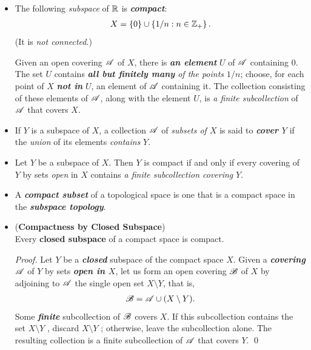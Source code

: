 \documentclass[11pt]{article}
\begin{document}
\begin{itemize}
\item \begin{example}
The following \emph{subspace} of ${\mathbb R}$ is \emph{\textbf{compact}}:
\begin{align*}
X = \left\{0\right\} \cup \left\{1/n: n\in {\mathbb Z}_{+}\right\}.
\end{align*} (It is \emph{not connected}.)

Given an open covering ${\mathscr A}$ of $X$, there is \emph{\textbf{an element}} $U$ of ${\mathscr A}$ containing $0$. The set $U$ contains \emph{\textbf{all but finitely many} of the points $1/n$}; choose, for each point of $X$ \emph{\textbf{not in}} $U$, an element of ${\mathscr A}$ containing it. The collection consisting of these elements of ${\mathscr A}$, along with the element $U$, is \emph{a finite subcollection} of ${\mathscr A}$ that covers $X$.
\end{example}

\item \begin{definition}
If $Y$ is a subspace of $X$, a collection ${\mathscr A}$ of \emph{subsets of $X$} is said to \emph{\textbf{cover $Y$}} if the \emph{union} of its elements \emph{contains} $Y$.
\end{definition}


\item \begin{lemma}
Let $Y$ be a subspace of $X$. Then $Y$ is compact if and only if every covering of $Y$ by sets \emph{open} in $X$ contains \emph{a finite subcollection covering} $Y$.
\end{lemma}

\item \begin{remark}
A \emph{\textbf{compact subset}} of a topological space is one that is a compact space in the \emph{\textbf{subspace topology}}. 
\end{remark}

\item \begin{proposition} (\textbf{Compactness by Closed Subspace}) \citep{munkres2000topology}\\
Every \textbf{closed subspace} of a compact space is compact.
\end{proposition}
\begin{proof}
Let $Y$ be a \emph{\textbf{closed}} subspace of the compact space $X$. Given a \emph{\textbf{covering}} ${\mathscr A}$ of $Y$ by sets \emph{\textbf{open in $X$}}, let us form an open covering ${\mathscr B}$ of $X$ by adjoining to ${\mathscr A}$ the single open set $X \setminus Y$, that is,
\begin{align*}
{\mathscr B} = {\mathscr A} \cup (X \setminus Y).
\end{align*}
Some \emph{\textbf{finite}} subcollection of ${\mathscr B}$ covers $X$. If this subcollection contains the set $X \setminus Y$ ,
discard $X \setminus Y$ ; otherwise, leave the subcollection alone. The resulting collection is a finite subcollection of ${\mathscr A}$ that covers $Y$. \qed
\end{proof}


\end{itemize}
\end{document}
